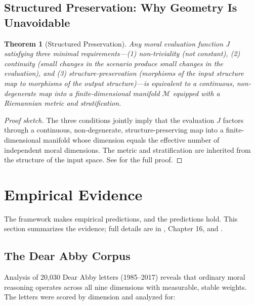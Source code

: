 \documentclass[12pt]{article}
\newtheorem{theorem}{Theorem}[section]
\theoremstyle{definition}
\theoremstyle{remark}
\newcommand{\M}{\mathcal{M}}
\begin{document}
\subsection{Structured Preservation: Why Geometry Is Unavoidable}

\begin{theorem}[Structured Preservation]
\label{thm:structured}
Any moral evaluation function $J$ satisfying three minimal requirements---(1) non-triviality (not constant), (2) continuity (small changes in the scenario produce small changes in the evaluation), and (3) structure-preservation (morphisms of the input structure map to morphisms of the output structure)---is equivalent to a continuous, non-degenerate map into a finite-dimensional manifold $\M$ equipped with a Riemannian metric and stratification.
\end{theorem}

\begin{proof}[Proof sketch]
The three conditions jointly imply that the evaluation $J$ factors through a continuous, non-degenerate, structure-preserving map into a finite-dimensional manifold whose dimension equals the effective number of independent moral dimensions. The metric and stratification are inherited from the structure of the input space. See \citet{anon2025a} for the full proof.
\end{proof}


\section{Empirical Evidence}
\label{sec:evidence}

The framework makes empirical predictions, and the predictions hold. This section summarizes the evidence; full details are in \citet{anon2026a}, Chapter 16, and \citet{anon2026d}.

\subsection{The Dear Abby Corpus}

Analysis of 20,030 Dear Abby letters (1985--2017) reveals that ordinary moral reasoning operates across all nine dimensions with measurable, stable weights. The letters were scored by dimension and analyzed for:
\end{document}
